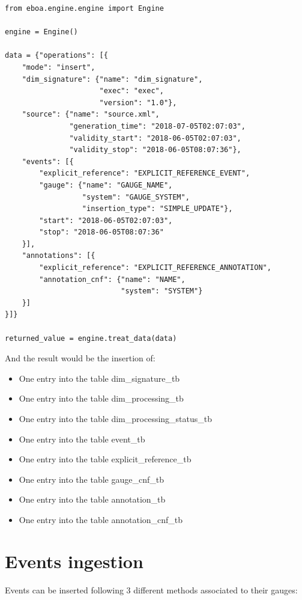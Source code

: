 \begin{lstlisting}[style=python]
from eboa.engine.engine import Engine

engine = Engine()

data = {"operations": [{
    "mode": "insert",
    "dim_signature": {"name": "dim_signature",
                      "exec": "exec",
                      "version": "1.0"},
    "source": {"name": "source.xml",
               "generation_time": "2018-07-05T02:07:03",
               "validity_start": "2018-06-05T02:07:03",
               "validity_stop": "2018-06-05T08:07:36"},
    "events": [{
        "explicit_reference": "EXPLICIT_REFERENCE_EVENT",
        "gauge": {"name": "GAUGE_NAME",
                  "system": "GAUGE_SYSTEM",
                  "insertion_type": "SIMPLE_UPDATE"},
        "start": "2018-06-05T02:07:03",
        "stop": "2018-06-05T08:07:36"
    }],
    "annotations": [{
        "explicit_reference": "EXPLICIT_REFERENCE_ANNOTATION",
        "annotation_cnf": {"name": "NAME",
                           "system": "SYSTEM"}
    }]
}]}

returned_value = engine.treat_data(data)
\end{lstlisting}

And the result would be the insertion of:
\begin{itemize}
\item One entry into the table dim\_signature\_tb
\item One entry into the table dim\_processing\_tb
\item One entry into the table dim\_processing\_status\_tb
\item One entry into the table event\_tb
\item One entry into the table explicit\_reference\_tb
\item One entry into the table gauge\_cnf\_tb
\item One entry into the table annotation\_tb
\item One entry into the table annotation\_cnf\_tb
\end{itemize}

\section{Events ingestion}

Events can be inserted following 3 different methods associated to their gauges:

